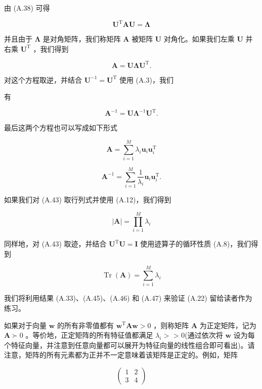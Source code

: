 \documentclass[10pt]{article}
\begin{document}
由 (A.38) 可得

\[
{\mathbf{U}}^{\mathrm{T}}\mathbf{A}\mathbf{U} = \mathbf{\Lambda } \tag{A.42}
\]

并且由于 \(\mathbf{\Lambda }\) 是对角矩阵，我们称矩阵 \(\mathbf{A}\) 被矩阵 \(\mathbf{U}\) 对角化。如果我们左乘 \(\mathbf{U}\) 并右乘 \({\mathbf{U}}^{\mathrm{T}}\) ，我们得到

\[
\mathbf{A} = \mathbf{U}\mathbf{\Lambda }{\mathbf{U}}^{\mathrm{T}}. \tag{A.43}
\]

对这个方程取逆，并结合 \({\mathbf{U}}^{-1} = {\mathbf{U}}^{\mathrm{T}}\) 使用 (A.3)，我们

有

\[
{\mathbf{A}}^{-1} = \mathbf{U}{\mathbf{\Lambda }}^{-1}{\mathbf{U}}^{\mathrm{T}}. \tag{A.44}
\]

最后这两个方程也可以写成如下形式

\[
\mathbf{A} = \mathop{\sum }\limits_{{i = 1}}^{M}{\lambda }_{i}{\mathbf{u}}_{i}{\mathbf{u}}_{i}^{\mathrm{T}} \tag{A.45}
\]

\[
{\mathbf{A}}^{-1} = \mathop{\sum }\limits_{{i = 1}}^{M}\frac{1}{{\lambda }_{i}}{\mathbf{u}}_{i}{\mathbf{u}}_{i}^{\mathrm{T}}. \tag{A.46}
\]

如果我们对 (A.43) 取行列式并使用 (A.12)，我们得到

\[
\left| \mathbf{A}\right|  = \mathop{\prod }\limits_{{i = 1}}^{M}{\lambda }_{i} \tag{A.47}
\]

同样地，对 (A.43) 取迹，并结合 \({\mathbf{U}}^{\mathrm{T}}\mathbf{U} = \mathbf{I}\) 使用迹算子的循环性质 (A.8)，我们得到

\[
\operatorname{Tr}\left( \mathbf{A}\right)  = \mathop{\sum }\limits_{{i = 1}}^{M}{\lambda }_{i} \tag{A.48}
\]

我们将利用结果 (A.33)、(A.45)、(A.46) 和 (A.47) 来验证 (A.22) 留给读者作为练习。

如果对于向量 \(\mathbf{w}\) 的所有非零值都有 \({\mathbf{w}}^{\mathrm{T}}\mathbf{A}\mathbf{w} > 0\) ，则称矩阵 \(\mathbf{A}\) 为正定矩阵，记为 \(\mathbf{A} \succ  0\) 。等价地，正定矩阵的所有特征值都满足 \({\lambda }_{i} >\) > 0(通过依次将 \(\mathbf{w}\) 设为每个特征向量，并注意到任意向量都可以展开为特征向量的线性组合即可看出)。请注意，矩阵的所有元素都为正并不一定意味着该矩阵是正定的。例如，矩阵

\[
\left( \begin{array}{ll} 1 & 2 \\  3 & 4 \end{array}\right)  \tag{A.49}
\]
\end{document}

